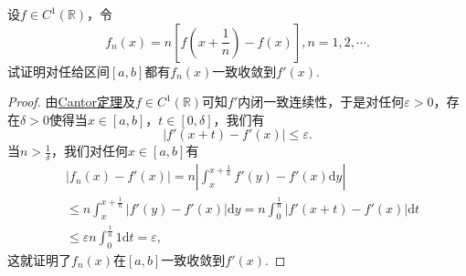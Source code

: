 \documentclass[../../main.tex]{subfiles}
\begin{document}
\begin{example}
设\(f \in C^1(\mathbb{R})\)，令
\[
f_n(x) = n \left[ f \left( x + \frac{1}{n} \right) - f(x) \right], n = 1, 2, \cdots.
\]
试证明对任给区间\([a, b]\)都有\(f_n(x)\)一致收敛到\(f'(x)\).
\end{example}
\begin{proof}
由\hyperref[theorem:Cantor定理]{Cantor定理}及\(f \in C^1(\mathbb{R})\)可知\(f'\)内闭一致连续性，于是对任何\(\varepsilon > 0\)，存在\(\delta > 0\)使得当\(x \in [a, b]\)，\(t \in [0, \delta]\)，我们有
\[
|f'(x + t) - f'(x)| \leqslant \varepsilon.
\]
当\(n > \frac{1}{\delta}\)，我们对任何\(x \in [a, b]\)有
\begin{align*}
&|f_n(x) - f'(x)| = n \left| \int_{x}^{x + \frac{1}{n}} f'(y) - f'(x) \mathrm{d}y \right| \\
&\leqslant n \int_{x}^{x + \frac{1}{n}} |f'(y) - f'(x)| \mathrm{d}y = n \int_{0}^{\frac{1}{n}} |f'(x + t) - f'(x)| \mathrm{d}t \\
&\leqslant \varepsilon n \int_{0}^{\frac{1}{n}} 1 \mathrm{d}t = \varepsilon,
\end{align*}
这就证明了\(f_n(x)\)在\([a, b]\)一致收敛到\(f'(x)\).

\end{proof}
\end{document}
